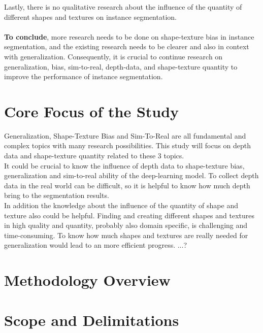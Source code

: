 		Lastly, there is no qualitative research about the influence of the quantity of different shapes and textures on instance segmentation.\\
		\\
		\textbf{To conclude}, more research needs to be done on shape-texture bias in instance segmentation, and the existing research needs to be clearer and also in context with generalization. Consequently, it is crucial to continue research on generalization, bias, sim-to-real, depth-data, and shape-texture quantity to improve the performance of instance segmentation.
		
		
		
		
		
	
	
	
	\section{Core Focus of the Study}    %
	\label{sec:core-focus-of-the-study}
		Generalization, Shape-Texture Bias and Sim-To-Real are all fundamental and complex topics with many research possibilities. This study will focus on depth data and shape-texture quantity related to these 3 topics.\\
		It could be crucial to know the influence of depth data to shape-texture bias, generalization and sim-to-real ability of the deep-learning model. To collect depth data in the real world can be difficult, so it is helpful to know how much depth bring to the segmentation results.\\
		In addition the knowledge about the influence of the quantity of shape and texture also could be helpful. Finding and creating different shapes and textures in high quality and quantity, probably also domain specific, is challenging and time-consuming. To know how much shapes and textures are really needed for generalization would lead to an more efficient progress.
		...?
	
	
	
	\section{Methodology Overview}
	\label{sec:methodology-overview}
	
	
	
	\section{Scope and Delimitations}
	\label{sec:scope-and-delimitations}
	
